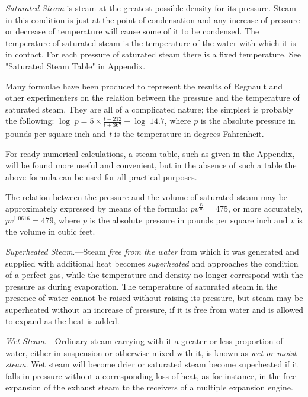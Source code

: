\documentclass[11pt, a5paper]{book}
\begin{document}
\textit{Saturated Steam} is steam at the greatest possible density for
its pressure.  Steam in this condition is just at the point of
condensation and any increase of pressure or decrease of temperature
will cause some of it to be condensed.  The temperature of saturated
steam is the temperature of the water with which it is in contact.
For each pressure of saturated steam there is a fixed temperature.
See "Saturated Steam Table" in Appendix.\par

Many formulae have been produced to represent the results of Regnault
and other experimenters on the relation between the pressure and the
temperature of saturated steam.  They are all of a complicated nature;
the simplest is probably the following:
$\log\; p=5\times\frac{t-212}{t+367}+\log\; 14.7$,
where \textit{p} is the
absolute pressure in pounds per square inch and \textit{t} is the
temperature in degrees Fahrenheit.\par

For ready numerical calculations, a steam table, such as given in the
Appendix, will be found more useful and convenient, but in the absence
of such a table the above formula can be used for all practical
purposes.\par

The relation between the pressure and the volume of saturated steam
may be approximately expressed by means of the formula:
$pv^\frac{17}{16} = 475$, or more accurately, $pv^1.0616 = 479$, where
\textit{p} is the absolute pressure in pounds per square inch and
\textit{v} is the volume in cubic feet.\par

\textit{Superheated Steam}.---Steam \textit{free from the water} from
which it was generated and supplied with additional heat becomes
\textit{superheated} and approaches the condition of a perfect gas,
while the temperature and density no longer correspond with the
pressure as during evaporation.  The temperature of saturated steam in
the presence of water cannot be raised without raising its pressure,
but steam may be superheated without an increase of pressure, if it is
free from water and is allowed to expand as the heat is added.\par

\textit{Wet Steam}.---Ordinary steam carrying with it a greater or
less proportion of water, either in suspension or otherwise mixed with
it, is known as \textit{wet or moist steam}.  Wet steam will become
drier or saturated steam become superheated if it falls in pressure
without a corresponding loss of heat, as for instance, in the free
expansion of the exhaust steam to the receivers of a multiple
expansion engine.\par
\end{document}

